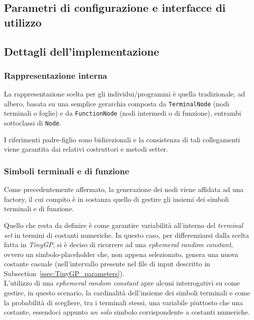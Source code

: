 \documentclass{../llncs}
\newcommand{\xss}[1]{\subsectionname~\ref{ssec:#1}}
\newcommand{\subsectionname}{Subsection}
\begin{document}
\subsection{Parametri di configurazione e interfacce di utilizzo}

\subsection{Dettagli dell'implementazione}
\subsubsection{Rappresentazione interna}
La rappresentazione scelta per gli individui/programmi è quella tradizionale, ad albero, basata su una semplice gerarchia composta da \texttt{TerminalNode} (nodi terminali o foglie) e da \texttt{FunctionNode} (nodi intermedi o di funzione), entrambi sottoclassi di \texttt{Node}.

I riferimenti padre-figlio sono bidirezionali e la consistenza di tali collegamenti viene garantita dai relativi costruttori e metodi setter.

\subsubsection{Simboli terminali e di funzione}
Come precedentemente affermato, la generazione dei nodi viene affidata ad una factory, il cui compito è in sostanza quello di gestire gli insiemi dei simboli terminali e di funzione. %

Quello che resta da definire è come garantire variabilità all'interno del \emph{terminal set} in termini di costanti numeriche. In questo caso, per differenziarsi dalla scelta fatta in \emph{TinyGP}, si è deciso di ricorrere ad una \emph{ephemeral random constant}, ovvero un simbolo-placeholder che, non appena selezionato, genera una nuova costante casuale (nell'intervallo presente nel file di input descritto in \xss{TinyGP_parameters}).\\

L'utilizzo di una \emph{ephemeral random constant} apre alcuni interrogativi su come gestire, in questo scenario, la cardinalità dell'insieme dei simboli terminali e come la probabilità di scegliere, tra i terminali stessi, una variabile piuttosto che una costante, essendoci appunto \emph{un solo} simbolo corrispondente a costanti numeriche.
\end{document}
